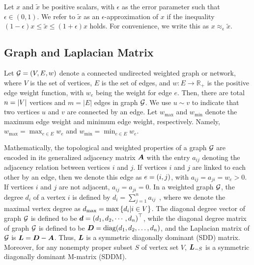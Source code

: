\documentclass[10pt,twocolumn,twoside]{IEEEtran}
\begin{document}


\begin{definition}
    Let \(x\) and \(\tilde{x}\) be positive scalars, with \(\epsilon\) as the error parameter such that \(\epsilon\in(0,1)\). We refer to \(\tilde{x}\) as an \(\epsilon\)-approximation of \(x\) if the inequality \((1-\epsilon)x\le \tilde{x}\le(1+\epsilon)x\) holds. For convenience, we write this as \(x\approx_{\epsilon}\tilde{x}\).
\end{definition}



\subsection{Graph and Laplacian Matrix}\label{sub:lap}

Let \(\mathcal{G}=(V,E,w)\) denote a connected undirected weighted graph or network,  where \(V\) is the set of vertices,  \(E\) is the set of edges, and  \(w: E\to \mathbb{R}_{+}\) is the positive edge weight function, with \(w_e\) being the weight for edge \(e\). Then, there are total \(n=\left|V \right|\) vertices and \(m=|E|\) edges in graph \(\mathcal{G}\). We use \(u \sim v\) to indicate that two vertices \(u\) and \(v\) are connected by an edge. Let \(w_{\max}\) and \(w_{\min}\) denote the maximum edge weight and minimum edge weight, respectively. Namely, \(w_{\max}=\max_{e\in E} w_e \) and \(w_{\min}=\min_{e\in E} w_e\).

Mathematically, the topological and weighted properties of a graph \(\mathcal{G}\) are encoded in its generalized adjacency matrix \(\boldsymbol{A}\) with the entry \(a_{ij}\) denoting the adjacency relation between vertices \(i\) and \(j\). If vertices \(i\) and \(j\) are linked to each other by an edge, then we denote this edge as \(e=\left( i,j \right)\), with \(a_{ij}= a_{ji}=w_{e}> 0\). If vertices \(i\) and \(j\) are not adjacent, \(a_{ij}=a_{ji}=0\). In a weighted graph \(\mathcal{G}\), the degree \(d_i\) of a vertex \(i\) is defined by \(d_i=\sum_{j=1}^n a_{ij}\)~\cite{BaBaPaVe04}, where we denote the maximal vertex degree as \(d_{\max}=\max\left\{d_i|i\in V \right\}\).
The diagonal degree vector of graph \(\mathcal{G}\) is defined to be \(\boldsymbol{d}=\left( d_1,d_2,\cdots,d_n \right)^\top\), while the diagonal degree matrix of graph \(\mathcal{G}\) is defined to be \({\boldsymbol{D}} = {\rm diag}(d_1, d_2, \ldots, d_n)\), and the Laplacian matrix of \(\mathcal{G}\) is \({\boldsymbol{L}}={\boldsymbol{D}}-{\boldsymbol{A}}\). Thus, \(\boldsymbol{L}\)  is a symmetric diagonally dominant (SDD) matrix. Moreover, for
any  nonempty  proper subset  \(S \) of vertex set $V$, \(\boldsymbol{L}_{-S}\) is a symmetric diagonally dominant M-matrix (SDDM).
\end{document}

